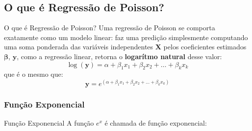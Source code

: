 \subsection{O que é Regressão de Poisson?}
\begin{frame}{O que é Regressão de Poisson?}
    Uma regressão de Poisson se comporta exatamente como um modelo linear:
    faz uma predição simplesmente computando uma soma ponderada das variáveis
    independentes $\mathbf{X}$ pelos coeficientes estimados $\boldsymbol{\beta}$,
    $\boldsymbol{y}$, como a regressão linear, retorna o \textbf{logarítmo natural}
    desse valor:
    $$
    \log(\boldsymbol{y})= \alpha + \beta_1 x_1 + \beta_2 x_2 + \dots + \beta_k x_k
    $$
    que é o mesmo que:
    $$
    \boldsymbol{y} = e^{(\alpha + \beta_1 x_1 + \beta_2 x_2 + \dots + \beta_k x_k)}
    $$
\end{frame}

\subsubsection{Função Exponencial}
\begin{frame}{Função Exponencial}
    A função $e^x$ é chamada de função exponencial:
\end{frame}

